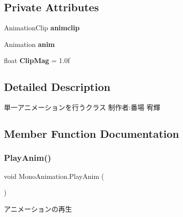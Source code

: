 \subsection*{Private Attributes}
\begin{DoxyCompactItemize}
\item 
\mbox{\label{class_mono_animation_a241e93a15c988b9db5993ed88c593df7}} 
Animation\+Clip {\bfseries animclip}
\item 
\mbox{\label{class_mono_animation_a46953c658799ed61a45a83a0072dcae1}} 
Animation {\bfseries anim}
\item 
\mbox{\label{class_mono_animation_a1b5f525fb0a46069e6525ddac4b76a64}} 
float {\bfseries Clip\+Mag} = 1.\+0f
\end{DoxyCompactItemize}


\subsection{Detailed Description}
単一アニメーションを行うクラス 制作者\+:番場 宥輝 



\subsection{Member Function Documentation}
\mbox{\label{class_mono_animation_a89ea28da9b3ba3fd9a147c778989009c}} 
\subsubsection{\texorpdfstring{Play\+Anim()}{PlayAnim()}}
{\footnotesize\ttfamily void Mono\+Animation.\+Play\+Anim (\begin{DoxyParamCaption}{ }\end{DoxyParamCaption})\hspace{0.3cm}{\ttfamily [inline]}}



アニメーションの再生 

\mbox{\label{class_mono_animation_ad1f8c94c63be3057dcd516979d6e8985}} 
